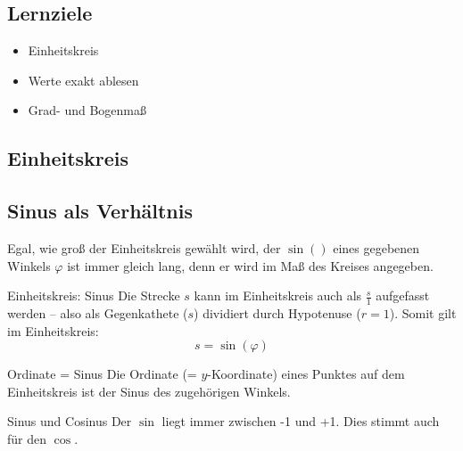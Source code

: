 \subsection*{Lernziele}

\begin{itemize}
\item Einheitskreis
\item Werte exakt ablesen
\item Grad- und Bogenmaß
\end{itemize}

\newpage
\subsection{Einheitskreis}





\subsection{Sinus als Verhältnis}
Egal, wie groß der Einheitskreis gewählt wird, der $\sin()$ eines
gegebenen Winkels $\varphi$ ist immer gleich lang, denn er wird im Maß
des Kreises angegeben.


\begin{gesetz}{Einheitskreis: Sinus}{}
  Die Strecke $s$ kann im Einheitskreis auch als $\frac{s}1$ aufgefasst werden -- also
  als Gegenkathete ($s$) dividiert durch Hypotenuse ($r=1$). Somit
  gilt im Einheitskreis:
  $$s = \sin(\varphi)$$
\end{gesetz}

\begin{bemerkung}{Ordinate = Sinus}{}
  Die Ordinate (= $y$-Koordinate) eines Punktes auf dem Einheitskreis ist
  der Sinus des zugehörigen Winkels.
\end{bemerkung}

\begin{bemerkung}{Sinus und Cosinus}{}
Der $\sin{}$ liegt immer zwischen -1 und
+1. Dies stimmt auch für den $\cos{}$.
\end{bemerkung}


\newpage

